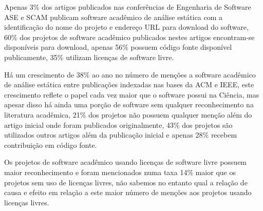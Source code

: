 \label{conclusoes}


Apenas 3\% dos artigos publicados nas conferências de Engenharia de Software
ASE e SCAM publicam software acadêmico de análise estática com a identificação
do nome do projeto e endereço URL para download do software, 60\% dos projetos
de software acadêmico publicados nestes artigos encontram-se disponíveis para
download, apenas 56\% possuem código fonte disponível publicamente, 35\%
utilizam licenças de software livre.



Há um crescimento de 38\% ao ano no número de menções a software acadêmico de
análise estática entre publicações indexadas nas bases da ACM e IEEE, este
crescimento reflete o papel cada vez maior que o software possui na Ciência,
mas apesar disso há ainda uma porção de software sem qualquer reconhecimento na
literatura acadêmica, 21\% dos projetos não possuem qualquer menção além do
artigo inicial onde foram publicados originalmente, 43\% dos projetos são
utilizados outros artigos além da publicação inicial e apenas 28\% recebem
contribuição em código fonte.


Os projetos de software acadêmico usando licenças de software livre possuem
maior reconhecimento e foram mencionados numa taxa 14\% maior que os projetos
sem uso de licenças livres, não sabemos no entanto qual a relação de causa e
efeito em relação a este maior número de menções aos projetos usando licenças
livres.


